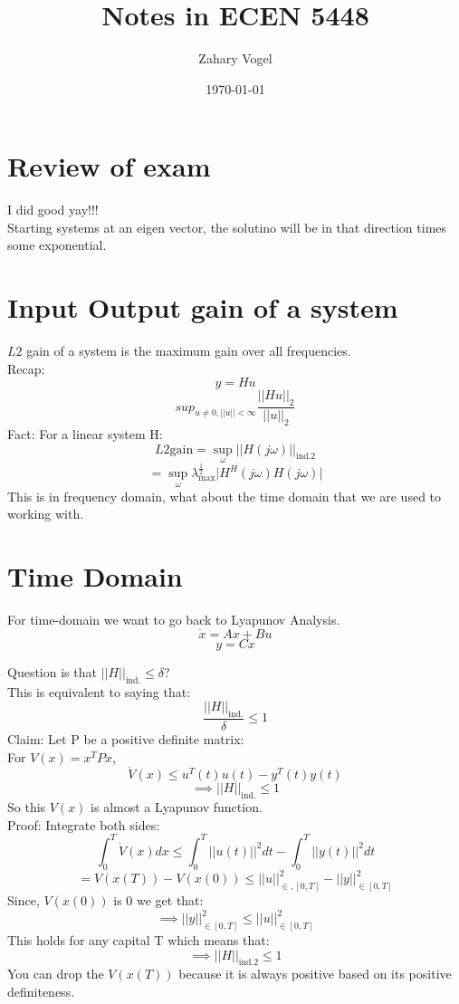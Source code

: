 \documentclass{article}
\author{Zahary Vogel}
\date{\today}
\title{Notes in ECEN 5448}
\begin{document}
\maketitle


\section{Review of exam}
I did good yay!!!\\
Starting systems at an eigen vector, the solutino will be in that direction times some exponential.\\

\section{Input Output gain of a system}
$L2$ gain of a system is the maximum gain over all frequencies.\\
Recap:\\
\[y=Hu\]
\[sup_{u\neq 0,\lvert\lvert u\rvert\rvert<\infty}\frac{\lvert\lvert Hu\rvert\rvert_2}{\lvert\lvert u\rvert\rvert_2}\]
Fact: For a linear system H:
\[L2\text{gain}=\sup_{\omega}\lvert\lvert H(j\omega)\rvert\rvert_{\text{ind.}2}\]
\[=\sup_{\omega}\lambda_{\text{max}}^{\frac{1}{2}}\lvert H^{H}(j\omega)H(j\omega)\rvert\]
This is in frequency domain, what about the time domain that we are used to working with.\\
\section{Time Domain}
For time-domain we want to go back to Lyapunov Analysis.\\
\[\dot{x}=Ax+Bu\]
\[y=Cx\]

Question is that $\lvert\lvert H\rvert\rvert_{\text{ind.}}\leq \delta$?\\
This is equivalent to saying that:\\
\[\frac{\lvert\lvert H\rvert\rvert_{\text{ind.}}}{\delta}\leq 1\]
Claim: Let P be a positive definite matrix:\\
For $V(x)=x^TPx$,
\[\dot{V}(x)\leq u^T(t)u(t)-y^T(t)y(t)\]
\[\implies \lvert\lvert H\rvert\rvert_{\text{ind.}}\leq 1\]
So this $V(x)$ is almost a Lyapunov function.\\
Proof: Integrate both sides:\\
\[\int_0^T\dot{V}(x)dx\leq\int_0^T\lvert\lvert u(t)\rvert\rvert^2dt-\int_0^T\lvert\lvert y(t)\rvert\rvert^2dt\]
\[=V(x(T))-V(x(0))\leq \lvert\lvert u\rvert\rvert^2_{\in,[0,T]}-\lvert\lvert y\rvert\rvert^2_{\in [0,T]}\]
Since, $V(x(0))$ is 0 we get that:
\[\implies\lvert\lvert y\rvert\rvert^2_{\in [0,T]}\leq \lvert\lvert u\rvert\rvert^2_{\in[0,T]}\]
This holds for any capital T which means that:
\[\implies\lvert\lvert H\rvert\rvert_{\text{ind.}2}\leq 1\]
You can drop the $V(x(T))$ because it is always positive based on its positive definiteness.\\
\end{document}
